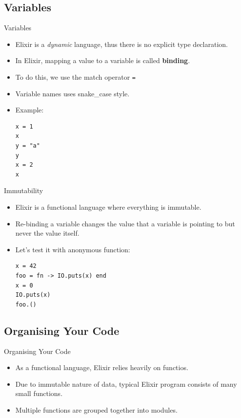 \documentclass[12pt]{beamer}
\begin{document}
\subsection{Variables}
\begin{frame}[fragile]{Variables}
  \begin{itemize}
    \item Elixir is a \textit{dynamic} language, thus there is no explicit type declaration.
    \item In Elixir, mapping a value to a variable is called \textbf{binding}.
    \item To do this, we use the match operator \texttt{=}
    \item Variable names uses snake\_case style.
    \item Example:
          \begin{verbatim}
x = 1
x
y = "a"
y
x = 2
x
  \end{verbatim}
  \end{itemize}
\end{frame}

\begin{frame}[fragile]{Immutability}
  \begin{itemize}
    \item Elixir is a functional language where everything is immutable.
    \item Re-binding a variable changes the value that a variable is pointing to but never the value itself.
    \item Let's test it with anonymous function:
          \begin{verbatim}
x = 42
foo = fn -> IO.puts(x) end
x = 0
IO.puts(x)
foo.()
        \end{verbatim}
  \end{itemize}
\end{frame}

\subsection{Organising Your Code}
\begin{frame}{Organising Your Code}
  \begin{itemize}
    \item As a functional language, Elixir relies heavily on functios.
    \item Due to immutable nature of data, typical Elixir program consists of many small functions.
    \item Multiple functions are grouped together into modules.
  \end{itemize}
\end{frame}
\end{document}
